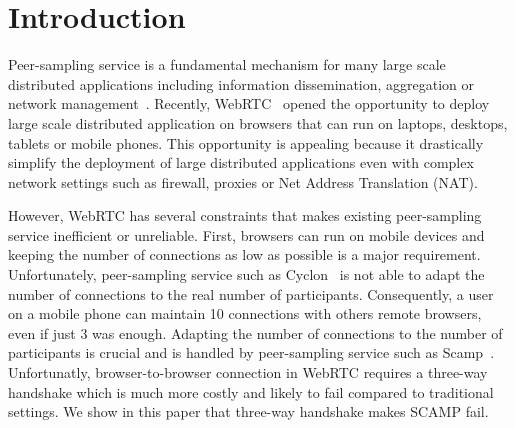 
\section{Introduction}

Peer-sampling service is a fundamental mechanism for many large scale
distributed applications including information dissemination,
aggregation or network management~\cite{jelasity2007gossip}. Recently,
WebRTC~\cite{webrtc} opened the opportunity to deploy large scale
distributed application on browsers that can run on laptops, desktops,
tablets or mobile phones. This opportunity is appealing because it
drastically simplify the deployment of large distributed applications
even with complex network settings such as firewall, proxies or Net
Address Translation (NAT).


However, WebRTC has several constraints that makes existing
peer-sampling service inefficient or unreliable. First, browsers can
run on mobile devices and keeping the number of connections as low as
possible is a major requirement. Unfortunately, peer-sampling service
such as Cyclon~\cite{ voulgaris2005cyclon} is not able to adapt the
number of connections to the real number of
participants. Consequently, a user on a mobile phone can maintain 10
connections with others remote browsers, even if just 3 was
enough. Adapting the number of connections to the number of
participants is crucial and is handled by peer-sampling service such
as Scamp~\cite{ganesh2003peer}. Unfortunatly, browser-to-browser connection
in WebRTC requires a three-way handshake which is much more costly and
likely to fail compared to traditional settings. We show in this paper
that three-way handshake makes SCAMP fail. 


